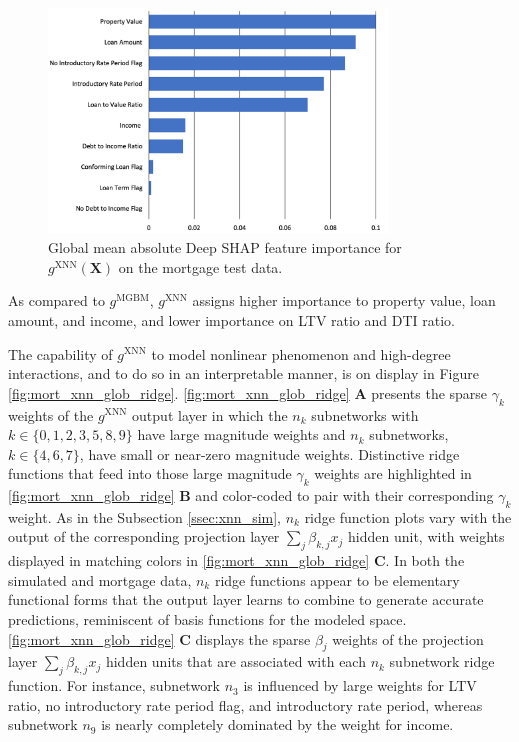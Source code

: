 \documentclass[information,article,submit,moreauthors,pdftex]{definitions/mdpi}
\begin{document}
\begin{figure}[htb]
\centering
\includegraphics[width=9cm]{img/mort_xnn_glob.png}
\caption{Global mean absolute Deep SHAP feature importance for $g^\text{XNN}(\mathbf{X})$ on the mortgage test data.}
\label{fig:mort_xnn_glob}
\end{figure} 

\noindent As compared to $g^\text{MGBM}$, $g^\text{XNN}$ assigns higher importance to property value, loan amount, and income, and lower importance on LTV ratio and DTI ratio. 

The capability of $g^\text{XNN}$ to model nonlinear phenomenon and high-degree interactions, and to do so in an interpretable manner, is on display in Figure \ref{fig:mort_xnn_glob_ridge}. \ref{fig:mort_xnn_glob_ridge} \textbf{A} presents the sparse $\gamma_k$ weights of the $g^\text{XNN}$ output layer in which the $n_k$ subnetworks with $k \in \{0,1,2,3,5,8,9\}$ have large magnitude weights and $n_k$ subnetworks, $k \in \{4,6,7\}$, have small or near-zero magnitude weights. Distinctive ridge functions that feed into those large magnitude $\gamma_k$ weights are highlighted in \ref{fig:mort_xnn_glob_ridge} \textbf{B} and color-coded to pair with their corresponding $\gamma_k$ weight. As in the Subsection \ref{ssec:xnn_sim}, $n_k$ ridge function plots vary with the output of the corresponding projection layer $\sum_j\beta_{k,j}x_j$ hidden unit, with weights displayed in matching colors in \ref{fig:mort_xnn_glob_ridge} \textbf{C}. In both the simulated and mortgage data, $n_k$ ridge functions appear to be elementary functional forms that the output layer learns to combine to generate accurate predictions, reminiscent of basis functions for the modeled space. \ref{fig:mort_xnn_glob_ridge} \textbf{C} displays the sparse $\beta_j$ weights of the projection layer $\sum_j\beta_{k,j}x_j$ hidden units that are associated with each $n_k$ subnetwork ridge function. For instance, subnetwork $n_3$ is influenced by large weights for LTV ratio, no introductory rate period flag, and introductory rate period, whereas subnetwork $n_9$ is nearly completely dominated by the weight for income. 
\end{document}
